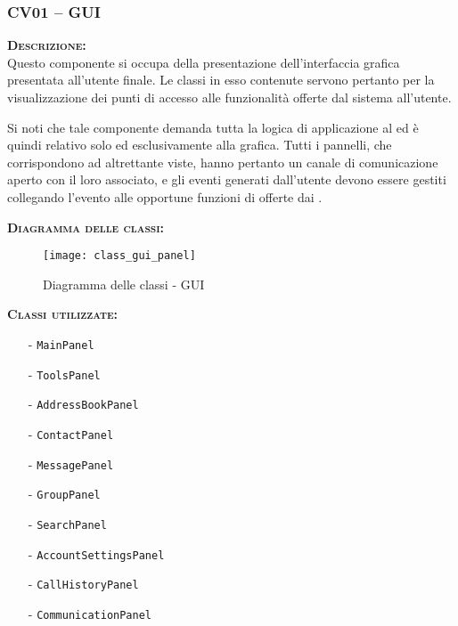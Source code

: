 \subsubsection{CV01 -- GUI}\label{sec:cv01}
\begin{description}
	\item{\scshape\bfseries Descrizione:}\\
Questo componente si occupa della presentazione dell'interfaccia grafica presentata all'utente finale. Le classi in esso contenute servono pertanto per la visualizzazione dei punti di accesso alle funzionalità offerte dal sistema all'utente.

Si noti che tale componente demanda tutta la logica di applicazione al  ed è quindi relativo solo ed esclusivamente alla grafica. Tutti i pannelli, che corrispondono ad altrettante viste, hanno pertanto un canale di comunicazione aperto con il  loro associato, e gli eventi generati dall'utente devono essere gestiti collegando l'evento alle opportune funzioni di  offerte dai .

	\item{\scshape\bfseries Diagramma delle classi:}
  \begin{figure}[H]
    \centering
    
   \texttt{[image: class\_gui\_panel]}
    \caption{Diagramma delle classi - GUI}\label{fig:gui}
  \end{figure}

	\item{\scshape\bfseries Classi utilizzate:} 
	\begin{itemize}[noitemsep,nolistsep]
		\item[-] \texttt{MainPanel}
		\item[-] \texttt{ToolsPanel}
		\item[-] \texttt{AddressBookPanel}
		\item[-] \texttt{ContactPanel}
		\item[-] \texttt{MessagePanel}
		\item[-] \texttt{GroupPanel}
		\item[-] \texttt{SearchPanel}
		\item[-] \texttt{AccountSettingsPanel}
		\item[-] \texttt{CallHistoryPanel}
		\item[-] \texttt{CommunicationPanel}
	\end{itemize}  
\end{description}


